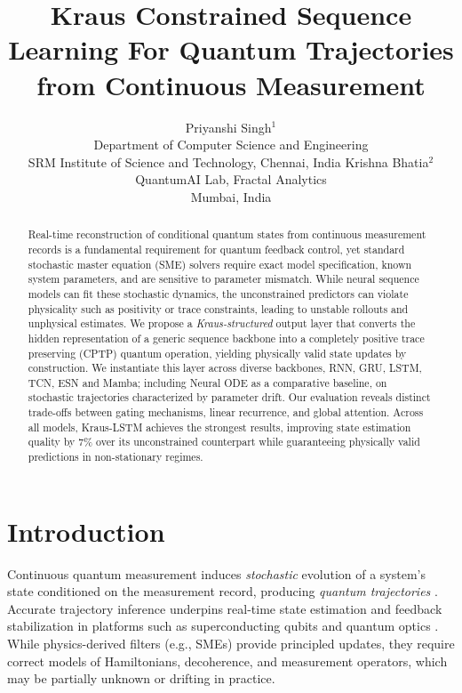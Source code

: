 \documentclass{article} %
\title{Kraus Constrained Sequence Learning For Quantum Trajectories from Continuous Measurement}
\author{
Priyanshi Singh$^1$ \\
Department of Computer Science and Engineering \\
SRM Institute of Science and Technology, Chennai, India
\And
Krishna Bhatia$^2$ \\
QuantumAI Lab, Fractal Analytics \\
Mumbai, India
}
\begin{document}
\maketitle

\begin{abstract}
Real-time reconstruction of conditional quantum states from continuous measurement records is a fundamental requirement for quantum feedback control, yet standard stochastic master equation (SME) solvers require exact model specification, known system parameters, and are sensitive to parameter mismatch.
While neural sequence models can fit these stochastic dynamics, the unconstrained predictors can violate physicality such as positivity or trace constraints, leading to unstable rollouts and unphysical estimates.
We propose a \emph{Kraus-structured} output layer that converts the hidden representation of a generic sequence backbone into a completely positive trace preserving (CPTP) quantum operation, yielding physically valid state updates by construction. We instantiate this layer across diverse backbones, RNN, GRU, LSTM, TCN, ESN and Mamba; including Neural ODE as a comparative baseline, on stochastic trajectories characterized by parameter drift.
Our evaluation reveals distinct trade-offs between gating mechanisms, linear recurrence, and global attention. Across all models, Kraus-LSTM achieves the strongest results, improving state estimation quality by $7\%$ over its unconstrained counterpart while guaranteeing physically valid predictions in non-stationary regimes.

\end{abstract}

\section{Introduction}
Continuous quantum measurement induces \emph{stochastic} evolution of a system's state conditioned on the measurement record, producing \emph{quantum trajectories} \citep{wiseman2010quantum,jacobs2006straightforward,rouchon2022tutorial}.
Accurate trajectory inference underpins real-time state estimation and feedback stabilization in platforms such as superconducting qubits and quantum optics \citep{flurin2020rnn}.
While physics-derived filters (e.g., SMEs) provide principled updates, they require correct models of Hamiltonians, decoherence, and measurement operators, which may be partially unknown or drifting in practice.
\end{document}
